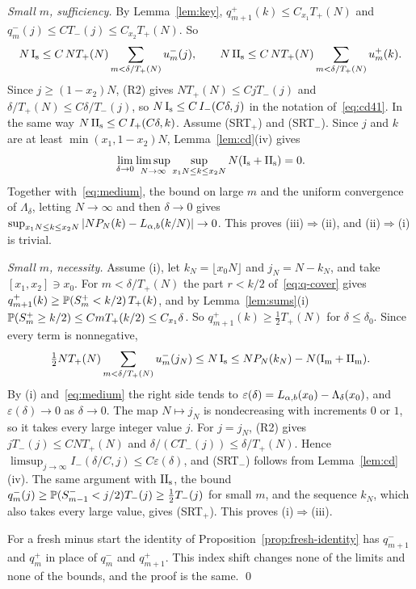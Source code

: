 \emph{Small $m$, sufficiency.} By Lemma~\ref{lem:key}, $q^\plus_{m+1}(k)\le C_{x_1}T_\plus(N)$ and
$q^\minus_m(j)\le CT_\minus(j)\le C_{x_2}T_\plus(N)$. So
\[
 N\,\mathrm I_{\rm s}\le C\,NT_{+}(N)\sum_{m<\delta/T_{+}(N)}u^{-}_m(j),\qquad
 N\,\mathrm{II}_{\rm s}\le C\,NT_{+}(N)\sum_{m<\delta/T_{+}(N)}u^{+}_m(k).
\]
Since $j\ge(1-x_2)N$, (R2) gives $NT_\plus(N)\le CjT_\minus(j)$ and
$\delta/T_\plus(N)\le C\delta/T_\minus(j)$, so $N\,\mathrm I_{\rm s}\le C\,I_{-}(C\delta,j)$
in the notation of~\eqref{eq:cd41}. In the same way
$N\,\mathrm{II}_{\rm s}\le C\,I_{+}(C\delta,k)$. Assume (SRT$_\plus$) and (SRT$_\minus$). Since
$j$ and $k$ are at least $\min(x_1,1-x_2)N$, Lemma~\ref{lem:cd}(iv) gives
\[
 \lim_{\delta\to0}\limsup_{N\to\infty}\sup_{x_1N\le k\le x_2N}N(\mathrm I_{\rm s}+\mathrm{II}_{\rm s})=0 .
\]
Together with~\eqref{eq:medium}, the bound on large $m$ and the uniform convergence of
$\Lambda_\delta$, letting $N\to\infty$ and then $\delta\to0$ gives
$\sup_{x_1N\le k\le x_2N}|NP_N(k)-L_{\alpha,b}(k/N)|\to0$. This proves (iii)$\Rightarrow$(ii), and
(ii)$\Rightarrow$(i) is trivial.

\emph{Small $m$, necessity.} Assume (i), let $k_N=\lfloor x_0N\rfloor$ and
$j_N=N-k_N$, and take $[x_1,x_2]\ni x_0$. For $m<\delta/T_\plus(N)$ the part $r<k/2$
of~\eqref{eq:q-cover} gives
$q^{+}_{m+1}(k)\ge\mathbb{P}(S^{+}_m<k/2)\,T_{+}(k)$, and by Lemma~\ref{lem:sums}(i)
$\mathbb{P}(S^{+}_m\ge k/2)\le CmT_{+}(k/2)\le C_{x_1}\delta$. So
$q^\plus_{m+1}(k)\ge\frac12T_\plus(N)$ for $\delta\le\delta_0$. Since every term is
nonnegative,
\[
 \tfrac12NT_{+}(N)\sum_{m<\delta/T_{+}(N)}u^{-}_m(j_N)\le N\,\mathrm I_{\rm s}
 \le NP_N(k_N)-N(\mathrm I_{\rm m}+\mathrm{II}_{\rm m}) .
\]
By (i) and~\eqref{eq:medium} the right side tends to
$\varepsilon(\delta)=L_{\alpha,b}(x_0)-\Lambda_\delta(x_0)$, and $\varepsilon(\delta)\to0$ as
$\delta\to0$. The map $N\mapsto j_N$ is nondecreasing with increments $0$ or $1$, so it
takes every large integer value $j$. For $j=j_N$, (R2) gives $jT_\minus(j)\le CNT_\plus(N)$
and $\delta/(CT_\minus(j))\le\delta/T_\plus(N)$. Hence
$\limsup_{j\to\infty}I_\minus(\delta/C,j)\le C\varepsilon(\delta)$, and (SRT$_\minus$) follows
from Lemma~\ref{lem:cd}(iv). The same argument with $\mathrm{II}_{\rm s}$, the bound
$q^{-}_m(j)\ge\mathbb{P}(S^{-}_{m-1}<j/2)T_{-}(j)\ge\frac12T_{-}(j)$ for small $m$, and the
sequence $k_N$, which also takes every large value, gives (SRT$_\plus$). This proves
(i)$\Rightarrow$(iii).

For a fresh minus start the identity of Proposition~\ref{prop:fresh-identity} has
$q^\minus_{m+1}$ and $q^\plus_m$ in place of $q^\minus_m$ and $q^\plus_{m+1}$. This index
shift changes none of the limits and none of the bounds, and the proof is the same.
\qed


